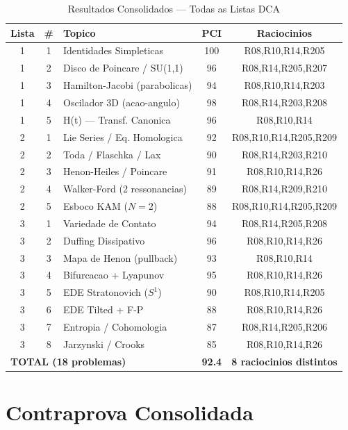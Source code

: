 \documentclass[12pt,a4paper,oneside]{article}
\begin{document}
\begin{table}[H]
\centering
\caption{Resultados Consolidados — Todas as Listas DCA}
\footnotesize
\begin{tabular}{cclcc}
\toprule
\textbf{Lista} & \textbf{\#} & \textbf{Topico} & \textbf{PCI} & \textbf{Raciocinios}\\
\midrule
\rowcolor{greenbg}
1 & 1 & Identidades Simpleticas & 100 & R08,R10,R14,R205\\
1 & 2 & Disco de Poincare / SU(1,1) & 96 & R08,R14,R205,R207\\
1 & 3 & Hamilton-Jacobi (parabolicas) & 94 & R08,R10,R14,R203\\
1 & 4 & Oscilador 3D (acao-angulo) & 98 & R08,R14,R203,R208\\
1 & 5 & H(t) — Transf. Canonica & 96 & R08,R10,R14\\
\midrule
2 & 1 & Lie Series / Eq. Homologica & 92 & R08,R10,R14,R205,R209\\
2 & 2 & Toda / Flaschka / Lax & 90 & R08,R14,R203,R210\\
2 & 3 & Henon-Heiles / Poincare & 91 & R08,R10,R14,R26\\
2 & 4 & Walker-Ford (2 ressonancias) & 89 & R08,R14,R209,R210\\
2 & 5 & Esboco KAM ($N=2$) & 88 & R08,R10,R14,R205,R209\\
\midrule
3 & 1 & Variedade de Contato & 94 & R08,R14,R205,R208\\
3 & 2 & Duffing Dissipativo & 96 & R08,R10,R14,R26\\
3 & 3 & Mapa de Henon (pullback) & 93 & R08,R10,R14\\
3 & 4 & Bifurcacao + Lyapunov & 95 & R08,R10,R14,R26\\
3 & 5 & EDE Stratonovich ($S^1$) & 90 & R08,R10,R14,R205\\
3 & 6 & EDE Tilted + F-P & 88 & R08,R10,R14,R26\\
3 & 7 & Entropia / Cohomologia & 87 & R08,R14,R205,R206\\
3 & 8 & Jarzynski / Crooks & 85 & R08,R10,R14,R26\\
\midrule
\multicolumn{3}{l}{\textbf{TOTAL (18 problemas)}} & \textbf{92.4} & \textbf{8 raciocinios distintos}\\
\bottomrule
\end{tabular}
\end{table}

\section{Contraprova Consolidada}
\end{document}
